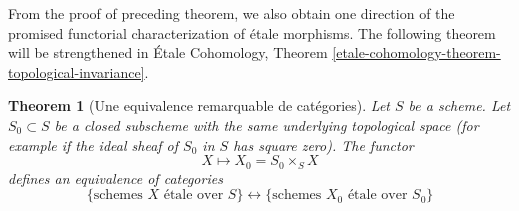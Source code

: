 \documentclass{stacks-project}
\newenvironment{reference}{\comment}{\endcomment}
\theoremstyle{plain}
\newtheorem{theorem}[subsection]{Theorem}
\theoremstyle{definition}
\theoremstyle{remark}
\numberwithin{equation}{subsection}
\begin{document}
\noindent
From the proof of preceding theorem, we also obtain one direction of the
promised functorial characterization of \'etale morphisms. The following
theorem will be strengthened in
\'Etale Cohomology,
Theorem \ref{etale-cohomology-theorem-topological-invariance}.

\begin{theorem}[Une equivalence remarquable de cat\'egories]
\label{theorem-remarkable-equivalence}
\begin{reference}
\cite[IV, Theorem 18.1.2]{EGA}
\end{reference}
Let $S$ be a scheme.
Let $S_0 \subset S$ be a closed subscheme with the same underlying
topological space (for example if the ideal sheaf of $S_0$ in $S$
has square zero). The functor
$$
X \longmapsto X_0 = S_0 \times_S X
$$
defines an equivalence of categories
$$
\{
\text{schemes }X\text{ \'etale over }S
\}
\leftrightarrow
\{
\text{schemes }X_0\text{ \'etale over }S_0
\}
$$
\end{theorem}
\end{document}
